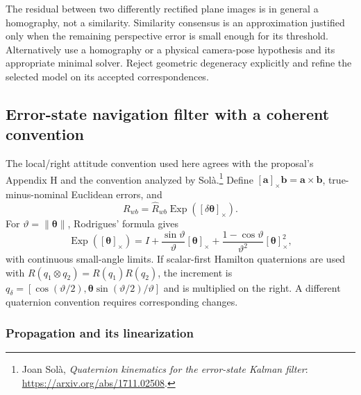 \documentclass[11pt,a4paper]{article}
\numberwithin{equation}{section}
\begin{document}
The residual between two differently rectified plane images is in
general a homography, not a similarity. Similarity consensus is an
approximation justified only when the remaining perspective error is
small enough for its threshold. Alternatively use a homography or a
physical camera-pose hypothesis and its appropriate minimal solver.
Reject geometric degeneracy explicitly and refine the selected model
on its accepted correspondences.

\subsection{Error-state navigation filter with a coherent convention}

The local/right attitude convention used here agrees with the proposal's
Appendix H and the convention analyzed by Sol\`a.\footnote{Joan Sol\`a,
\emph{Quaternion kinematics for the error-state Kalman filter}:
\url{https://arxiv.org/abs/1711.02508}.}
Define $[\boldsymbol a]_\times\boldsymbol b=\boldsymbol a\times
\boldsymbol b$, true-minus-nominal Euclidean errors, and
\begin{equation}
 R_{wb}=\widehat R_{wb}\operatorname{Exp}
                      ([\delta\boldsymbol\theta]_\times).
 \label{eq:right-attitude-error}
\end{equation}
For $\vartheta=\|\boldsymbol\theta\|$, Rodrigues' formula gives
\begin{equation}
 \operatorname{Exp}([\boldsymbol\theta]_\times)
 =I+\frac{\sin\vartheta}{\vartheta}[\boldsymbol\theta]_\times
  +\frac{1-\cos\vartheta}{\vartheta^2}[\boldsymbol\theta]_\times^2,
\end{equation}
with continuous small-angle limits. If scalar-first Hamilton quaternions
are used with $R(q_1\otimes q_2)=R(q_1)R(q_2)$, the increment is
$q_\delta=[\cos(\vartheta/2),
\boldsymbol\theta\sin(\vartheta/2)/\vartheta]$ and is multiplied on the
right. A different quaternion convention requires corresponding changes.

\subsubsection{Propagation and its linearization}
\end{document}
